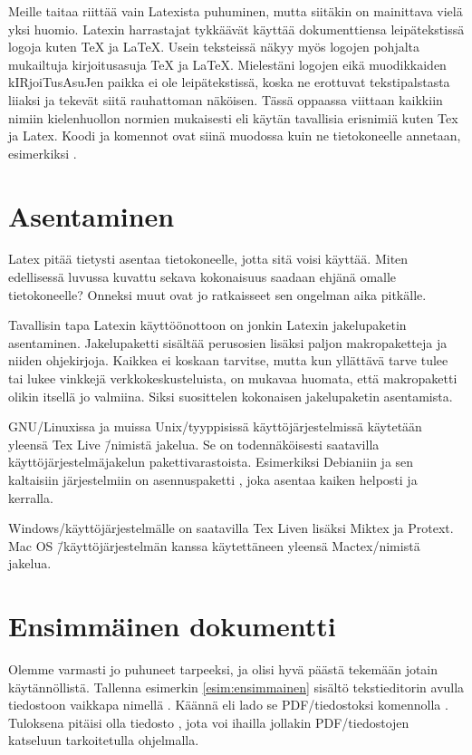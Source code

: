 Meille \marginpar{\Large\LaTeX} taitaa riittää vain Latexista puhuminen,
mutta siitäkin on mainittava vielä yksi huomio. Latexin harrastajat
tykkäävät käyttää dokumenttiensa leipätekstissä logoja kuten \TeX{} ja
\LaTeX{}. Usein teksteissä näkyy myös logojen pohjalta mukailtuja
kirjoitus\-asuja TeX ja LaTeX. Mielestäni logojen eikä muodikkaiden
kIRjoiTus\-AsuJen paikka ei ole leipätekstissä, koska ne erottuvat
tekstipalstasta liiaksi ja tekevät siitä rauhattoman näköisen. Tässä
oppaassa viittaan kaikkiin nimiin kielenhuollon normien mukaisesti eli
käytän tavallisia erisnimiä kuten Tex ja Latex. Koodi ja komennot ovat
siinä muodossa kuin ne tietokoneelle annetaan, esimerkiksi
.

\section{Asentaminen}
\label{luku:asentaminen}

Latex pitää tietysti asentaa tietokoneelle, jotta sitä voisi käyttää.
Miten edellisessä luvussa kuvattu sekava kokonaisuus saadaan ehjänä
omalle tietokoneelle? Onneksi muut ovat jo ratkaisseet sen ongelman aika
pitkälle.

Tavallisin tapa Latexin käyttöön\-ottoon on jonkin Latexin jakelupaketin
asentaminen. Jakelupaketti sisältää perus\-osien lisäksi paljon
makropaketteja ja niiden ohjekirjoja. Kaikkea ei koskaan tarvitse, mutta
kun yllättävä tarve tulee tai lukee vinkkejä verkkokeskusteluista, on
mukavaa huomata, että makropaketti olikin itsellä jo valmiina. Siksi
suosittelen kokonaisen jakelupaketin asentamista.

GNU/Linuxissa ja muissa Unix\-/tyyppisissä käyttöjärjestelmissä
käytetään yleensä Tex Live \=/nimistä jakelua. Se on todennäköisesti
saatavilla käyttöjärjestelmäjakelun pakettivarastoista. Esimerkiksi
Debianiin ja sen kaltaisiin järjestelmiin on asennuspaketti
, joka asentaa kaiken helposti ja kerralla.

Windows\-/käyttöjärjestelmälle on saatavilla Tex Liven lisäksi Miktex ja
Protext. Mac OS \=/käyttöjärjestelmän kanssa käytettäneen yleensä
Mactex\-/nimistä jakelua.

\section{Ensimmäinen dokumentti}

Olemme varmasti jo puhuneet tarpeeksi, ja olisi hyvä päästä tekemään
jotain käytännöllistä. Tallenna esimerkin \ref{esim:ensimmainen} sisältö
teksti\-editorin avulla tiedostoon vaikkapa nimellä .
Käännä eli lado se PDF\-/tiedostoksi komennolla . Tuloksena pitäisi olla tiedosto , jota
voi ihailla jollakin PDF\-/tiedostojen katseluun tarkoitetulla
ohjelmalla.

